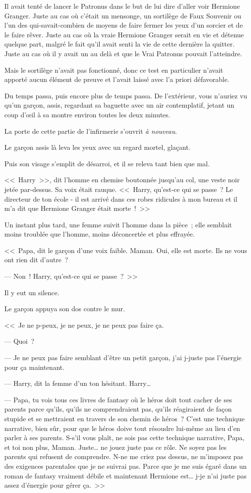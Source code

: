 Il avait tenté de lancer le Patronus dans le but de lui dire d'aller voir Hermione Granger. Juste au cas où c'était un mensonge, un sortilège de Faux Souvenir ou l'un des qui-savait-combien de moyens de faire fermer les yeux d'un sorcier et de le faire rêver. Juste au cas où la vraie Hermione Granger serait en vie et détenue quelque part, malgré le fait qu'il avait senti la vie de cette dernière la quitter. Juste au cas où il y avait un au delà et que le Vrai Patronus pouvait l'atteindre.

Mais le sortilège n'avait pas fonctionné, donc ce test en particulier n'avait apporté aucun élément de preuve et l'avait laissé avec l'a priori défavorable.

Du temps passa, puis encore plus de temps passa. De l'extérieur, vous n'auriez vu qu'un garçon, assis, regardant sa baguette avec un air contemplatif, jetant un coup d'œil à sa montre environ toutes les deux minutes.

La porte de cette partie de l'infirmerie s'ouvrit \emph{à nouveau}.

Le garçon assis là leva les yeux avec un regard mortel, glaçant.

Puis son visage s'emplit de désarroi, et il se releva tant bien que mal.

<<~Harry~>>, dit l'homme en chemise boutonnée jusqu'au col, une veste noir jetée par-dessus. Sa voix était rauque. <<~Harry, qu'est-ce qui se passe~? Le directeur de ton école - il est arrivé dans ces robes ridicules à mon bureau et il m'a dit que Hermione Granger était morte~!~>>

Un instant plus tard, une femme suivit l'homme dans la pièce~; elle semblait moins troublée que l'homme, moins déconcertée et plus effrayée.

<<~Papa, dit le garçon d'une voix faible. Maman. Oui, elle est morte. Ils ne vous ont rien dit d'autre~?

--- Non~! Harry, qu'est-ce qui se passe~?~>>

Il y eut un silence.

Le garçon appuya son dos contre le mur.

<<~Je ne p-peux, je ne peux, je ne peux pas faire ça.

--- Quoi~?

--- Je ne peux pas faire semblant d'être un petit garçon, j'ai j-juste pas l'énergie pour ça maintenant.

--- Harry, dit la femme d'un ton hésitant. Harry…

--- Papa, tu vois tous ces livres de fantasy où le héros doit tout cacher de ses parents parce qu'ils, qu'ils ne comprendraient pas, qu'ils réagiraient de façon stupide et se mettraient en travers de son chemin de héros~? C'est une technique narrative, bien sûr, pour que le héros doive tout résoudre lui-même au lieu d'en parler à ses parents. S-s'il vous plaît, ne sois pas cette technique narrative, Papa, et toi non plus, Maman. Juste… ne jouez juste pas ce rôle. Ne soyez pas les parents qui refusent de comprendre. N-ne me criez pas dessus, ne m'imposez pas des exigences parentales que je ne suivrai pas. Parce que je me suis égaré dans un roman de fantasy vraiment débile et maintenant Hermione est… j-je n'ai juste pas assez d'énergie pour gérer ça.~>>

